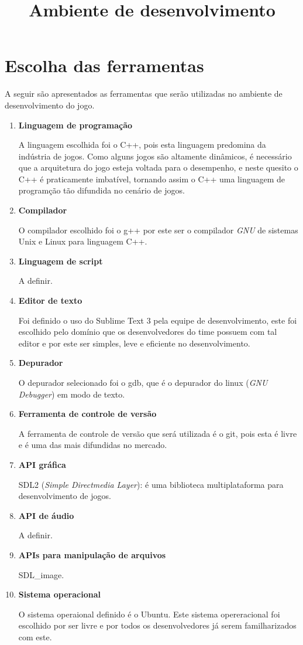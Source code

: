 \documentclass[a4paper, 11pt]{article} %
\title{\textbf{Ambiente de desenvolvimento}} %
\makeatletter
\renewcommand{\maketitle}{ %
\begin{center} %
{\LARGE\@title} %

\vspace{20pt} %

\end{center}
}
\makeatother
\begin{document}
\maketitle %


\section*{Escolha das ferramentas}

A seguir são apresentados as ferramentas que serão utilizadas no ambiente de desenvolvimento do jogo.

\begin{enumerate}
\item \textbf{Linguagem de programação}

A linguagem escolhida foi o C++, pois esta linguagem predomina da indústria de jogos. Como alguns jogos são altamente dinâmicos, é necessário que a arquitetura do jogo esteja voltada para o desempenho, e neste quesito o C++ é praticamente imbatível, tornando assim o C++ uma linguagem de programção tão difundida no cenário de jogos.

\item \textbf{Compilador}

O compilador escolhido foi o g++ por este ser o compilador \textit{GNU} de sistemas Unix e Linux para linguagem C++.
\item \textbf{Linguagem de script}

A definir.
\item \textbf{Editor de texto}

Foi definido o uso do Sublime Text 3 pela equipe de desenvolvimento, este foi escolhido pelo domínio que os desenvolvedores do time possuem com tal editor e por este ser simples, leve e eficiente no desenvolvimento.
\item \textbf{Depurador}

O depurador selecionado foi o  gdb, que é o depurador do linux (\textit{GNU Debugger}) em modo de texto.
\item \textbf{Ferramenta de controle de versão}

A ferramenta de controle de versão que será utilizada é o git, pois esta é livre e é uma das mais difundidas no mercado.
\item \textbf{API gráfica}

SDL2 (\textit{Simple Directmedia Layer}): é uma biblioteca multiplataforma para desenvolvimento de jogos.
\item \textbf{API de áudio}

A definir.
\item \textbf{APIs para manipulação de arquivos}

SDL\_image.
\item \textbf{Sistema operacional}

O sistema operaional definido é o Ubuntu. Este sistema opereracional foi escolhido por ser livre e por todos os desenvolvedores já serem familharizados com este.

\end{enumerate}
\end{document}

